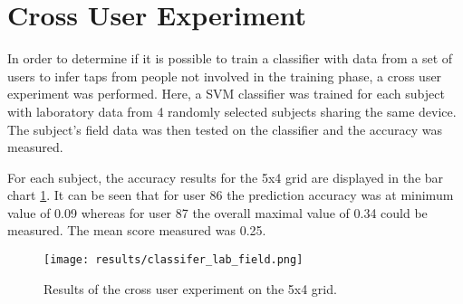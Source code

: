 \section{Cross User Experiment}
In order to determine if it is possible to train a classifier with data from a set of users to infer taps from people not involved in the training phase, a cross user experiment was performed. Here, a SVM classifier was trained for each subject with laboratory data from 4 randomly selected subjects sharing the same device. The subject's field data was then tested on the classifier and the accuracy was measured.

For each subject, the accuracy results for the 5x4 grid are displayed in the bar chart \ref{fig:cross_user_exp}. It can be seen that for user 86 the prediction accuracy was at minimum value of 0.09 whereas for user 87 the overall maximal value of 0.34 could be measured. The mean score measured was 0.25.


\begin{figure}[h!]
  \centering
  \texttt{[image: results/classifer\_lab\_field.png]}
  \caption{Results of the cross user experiment on the 5x4 grid.} \label{fig:cross_user_exp}
\end{figure}


